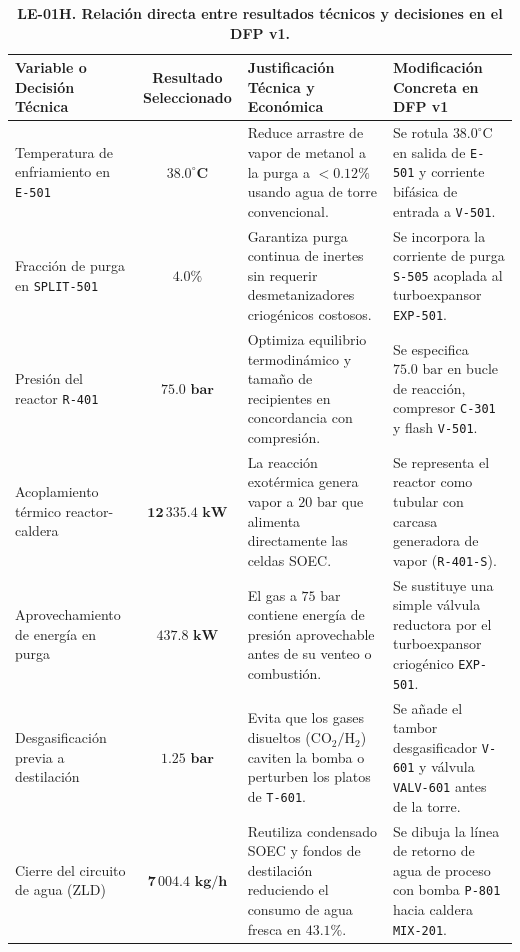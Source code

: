 \documentclass[10pt,letterpaper]{article}
\begin{document}
\begin{table}[H]
\centering
\small
\caption{\textbf{LE-01H. Relación directa entre resultados técnicos y decisiones en el DFP v1.}} \label{tab:cuadro11}
\begin{tabularx}{\textwidth}{p{3.2cm} c X p{4.2cm}}
\toprule
\textbf{Variable o Decisión Técnica} & \textbf{Resultado Seleccionado} & \textbf{Justificación Técnica y Económica} & \textbf{Modificación Concreta en DFP v1} \\
\midrule
Temperatura de enfriamiento en \texttt{E-501} & $\mathbf{38.0^\circ\text{C}}$ & Reduce arrastre de vapor de metanol a la purga a $<0.12\%$ usando agua de torre convencional. & Se rotula $38.0^\circ\text{C}$ en salida de \texttt{E-501} y corriente bifásica de entrada a \texttt{V-501}. \\
Fracción de purga en \texttt{SPLIT-501} & $\mathbf{4.0\%}$ & Garantiza purga continua de inertes sin requerir desmetanizadores criogénicos costosos. & Se incorpora la corriente de purga \texttt{S-505} acoplada al turboexpansor \texttt{EXP-501}. \\
Presión del reactor \texttt{R-401} & $\mathbf{75.0\text{ bar}}$ & Optimiza equilibrio termodinámico y tamaño de recipientes en concordancia con compresión. & Se especifica $75.0\text{ bar}$ en bucle de reacción, compresor \texttt{C-301} y flash \texttt{V-501}. \\
Acoplamiento térmico reactor-caldera & $\mathbf{12\,335.4\text{ kW}}$ & La reacción exotérmica genera vapor a $20\text{ bar}$ que alimenta directamente las celdas SOEC. & Se representa el reactor como tubular con carcasa generadora de vapor (\texttt{R-401-S}). \\
Aprovechamiento de energía en purga & $\mathbf{437.8\text{ kW}}$ & El gas a $75\text{ bar}$ contiene energía de presión aprovechable antes de su venteo o combustión. & Se sustituye una simple válvula reductora por el turboexpansor criogénico \texttt{EXP-501}. \\
Desgasificación previa a destilación & $\mathbf{1.25\text{ bar}}$ & Evita que los gases disueltos ($\text{CO}_2/\text{H}_2$) caviten la bomba o perturben los platos de \texttt{T-601}. & Se añade el tambor desgasificador \texttt{V-601} y válvula \texttt{VALV-601} antes de la torre. \\
Cierre del circuito de agua (ZLD) & $\mathbf{7\,004.4\text{ kg/h}}$ & Reutiliza condensado SOEC y fondos de destilación reduciendo el consumo de agua fresca en $43.1\%$. & Se dibuja la línea de retorno de agua de proceso con bomba \texttt{P-801} hacia caldera \texttt{MIX-201}. \\
\bottomrule
\end{tabularx}
\end{table}
\end{document}
